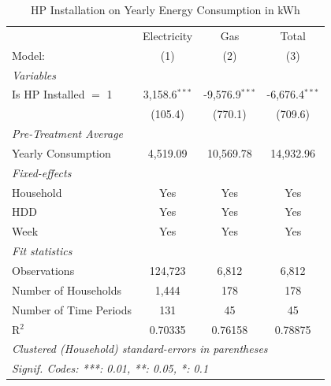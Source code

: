 
\begin{table}[htbp]
   \caption{HP Installation on Yearly Energy Consumption in kWh}
   \centering
   \begin{tabular}{lccc}
      \tabularnewline \midrule \midrule
                                     & Electricity     & Gas              & Total \\   
      Model:                         & (1)             & (2)              & (3)\\  
      \midrule
      \emph{Variables}\\
      Is HP Installed $=$ 1          & 3,158.6$^{***}$ & -9,576.9$^{***}$ & -6,676.4$^{***}$\\   
                                     & (105.4)         & (770.1)          & (709.6)\\   
      \midrule
\emph{Pre-Treatment Average}\\
      Yearly Consumption             & 4,519.09        & 10,569.78        & 14,932.96\\  
\midrule
      \emph{Fixed-effects}\\
      Household                      & Yes             & Yes              & Yes\\  
      HDD                            & Yes             & Yes              & Yes\\  
      Week                           & Yes             & Yes              & Yes\\  
      \midrule
      \emph{Fit statistics}\\
      Observations                   & 124,723         & 6,812            & 6,812\\  
      Number of Households & 1,444           & 178              & 178\\  
      Number of Time Periods         & 131             & 45               & 45\\  
      R$^2$                          & 0.70335         & 0.76158          & 0.78875\\  
      \midrule \midrule
      \multicolumn{4}{l}{\emph{Clustered (Household) standard-errors in parentheses}}\\
      \multicolumn{4}{l}{\emph{Signif. Codes: ***: 0.01, **: 0.05, *: 0.1}}\\
   \end{tabular}
\end{table}


